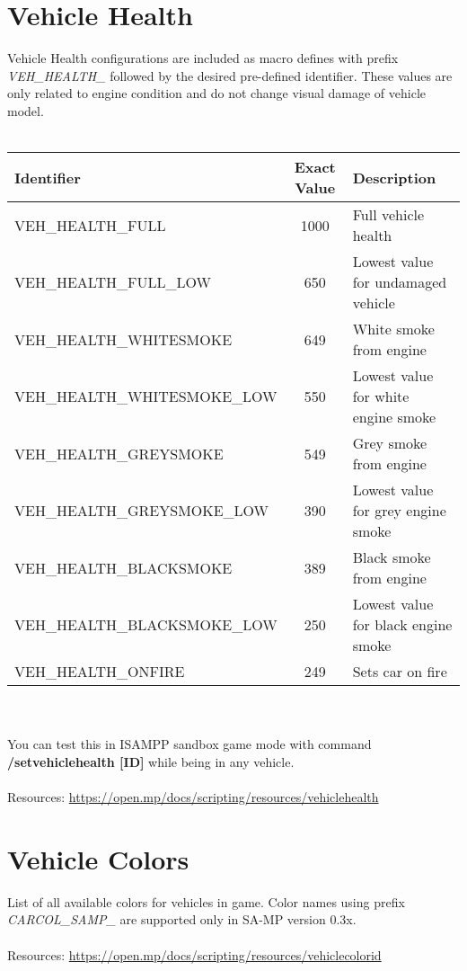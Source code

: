 \documentclass{article}
\begin{document}
\section{Vehicle Health}
Vehicle Health configurations are included as macro defines with prefix \textit{VEH\_HEALTH\_} followed by the desired pre-defined identifier. These values are only related to engine condition and do not change visual damage of vehicle model.
\\
\\
\begin{tabular}{ |l|c|l| } 
\hline
Identifier & Exact Value & Description \\
\hline
VEH\_HEALTH\_FULL & 1000 & Full vehicle health \\ 
VEH\_HEALTH\_FULL\_LOW & 650 &  Lowest value for undamaged vehicle \\ 
VEH\_HEALTH\_WHITESMOKE & 649 & White smoke from engine \\ 
VEH\_HEALTH\_WHITESMOKE\_LOW & 550 & Lowest value for white engine smoke \\ 
VEH\_HEALTH\_GREYSMOKE & 549 & Grey smoke from engine \\ 
VEH\_HEALTH\_GREYSMOKE\_LOW & 390 & Lowest value for grey engine smoke\\ 
VEH\_HEALTH\_BLACKSMOKE & 389 & Black smoke from engine \\ 
VEH\_HEALTH\_BLACKSMOKE\_LOW & 250 & Lowest value for black engine smoke \\ 
VEH\_HEALTH\_ONFIRE & 249 & Sets car on fire \\
\hline
\end{tabular}
\\
\\
You can test this in ISAMPP sandbox game mode with command \textbf{/setvehiclehealth [ID]} while being in any vehicle.
\\
\\Resources: \url{https://open.mp/docs/scripting/resources/vehiclehealth}


\newpage
\section{Vehicle Colors}
List of all available colors for vehicles in game. Color names using prefix \textit{CARCOL\_SAMP\_} are supported only in SA-MP version 0.3x.
\\
\\Resources: \url{https://open.mp/docs/scripting/resources/vehiclecolorid}
\end{document}

